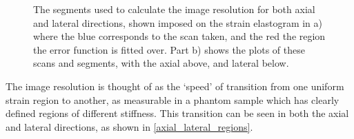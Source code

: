 \begin{figure}[t]
\begin{subfigure}{0.49\textwidth}
	\end{subfigure}
	\caption{The segments used to calculate the image resolution for both axial and lateral directions, shown imposed on the strain elastogram in a) where the blue corresponds to the scan taken, and the red the region the error function is fitted over. Part b) shows the plots of these scans and segments, with the axial above, and lateral below.}
	\label{axial_lateral_regions}	
\end{figure}

The image resolution is thought of as the `speed' of transition from one uniform strain region to another, as measurable in a phantom sample which has clearly defined regions of different stiffness. This transition can be seen in both the axial and lateral directions, as shown in \autoref{axial_lateral_regions}.

